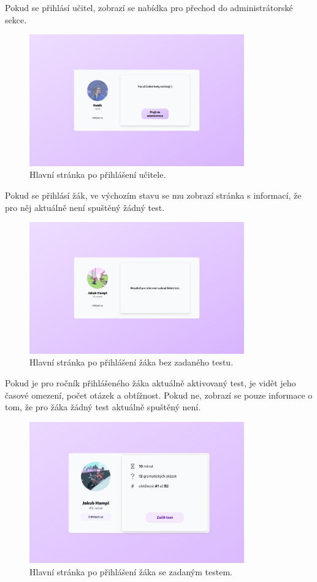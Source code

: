 \newpage

Pokud se přihlásí učitel, zobrazí se nabídka pro přechod do administrátorské sekce.

\begin{figure}[H]
    \centering
    \includegraphics[width=350px]{images/01design/teacher.png}
    \caption{Hlavní stránka po přihlášení učitele.}
\end{figure}

Pokud se přihlásí žák, ve výchozím stavu se mu zobrazí stránka s informací, že pro něj aktuálně není spuštěný žádný test.

\begin{figure}[H]
    \centering
    \includegraphics[width=350px]{images/01design/student-no-test.png}
    \caption{Hlavní stránka po přihlášení žáka bez zadaného testu.}
\end{figure}

Pokud je pro ročník přihlášeného žáka aktuálně aktivovaný test, je vidět jeho časové omezení, počet otázek a obtížnost. Pokud ne, zobrazí se pouze informace o tom, že pro žáka žádný test aktuálně spuštěný není.

\begin{figure}[H]
    \centering
    \includegraphics[width=350px]{images/01design/student-yes-test.png}
    \caption{Hlavní stránka po přihlášení žáka se zadaným testem.}
\end{figure}

